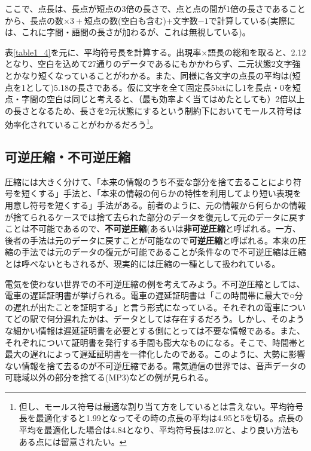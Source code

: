ここで、点長は、長点が短点の3倍の長さで、点と点の間が1倍の長さであることから、長点の数$\times 3+$短点の数(空白も含む)$+$文字数$-1$で計算している(実際には、これに字間・語間の長さが加わるが、これは無視している)。

表\ref{table1_4}を元に、平均符号長を計算する。出現率$\times$語長の総和を取ると、2.12となり、空白を込めて27通りのデータであるにもかかわらず、二元状態2文字強とかなり短くなっていることがわかる。また、同様に各文字の点長の平均は(短点を1として)5.18の長さである。仮に文字を全て固定長5bitにし1を長点・0を短点・字間の空白は同じと考えると、（最も効率よく当てはめたとしても）2倍以上の長さとなるため、長さを2元状態にするという制約下においてモールス符号は効率化されていることがわかるだろう\footnote{但し、モールス符号は最適な割り当て方をしているとは言えない。平均符号長を最適化すると1.99となってその時の点長の平均は4.95と5を切る。点長の平均を最適化した場合は4.84となり、平均符号長は2.07と、より良い方法もある点には留意されたい。}。


\subsection{可逆圧縮・不可逆圧縮}
圧縮には大きく分けて、「本来の情報のうち不要な部分を捨て去ることにより符号を短くする」手法と、「本来の情報の何らかの特性を利用してより短い表現を用意し符号を短くする」手法がある。前者のように、元の情報から何らかの情報が捨てられるケースでは捨て去られた部分のデータを復元して元のデータに戻すことは不可能であるので、\textbf{不可逆圧縮}(あるいは\textbf{非可逆圧縮}と呼ばれる。一方、後者の手法は元のデータに戻すことが可能なので\textbf{可逆圧縮}と呼ばれる。本来の圧縮の手法では元のデータの復元が可能であることが条件なので不可逆圧縮は圧縮とは呼べないともされるが、現実的には圧縮の一種として扱われている。

電気を使わない世界での不可逆圧縮の例を考えてみよう。不可逆圧縮としては、電車の遅延証明書が挙げられる。電車の遅延証明書は「この時間帯に最大で○分の遅れが出たことを証明する」と言う形式になっている。それぞれの電車についてどの駅で何分遅れたかは、データとしては存在するだろう。しかし、そのような細かい情報は遅延証明書を必要とする側にとっては不要な情報である。また、それぞれについて証明書を発行する手間も膨大なものになる。そこで、時間帯と最大の遅れによって遅延証明書を一律化したのである。このように、大勢に影響ない情報を捨て去るのが不可逆圧縮である。電気通信の世界では、音声データの可聴域以外の部分を捨てる(MP3)などの例が見られる。

